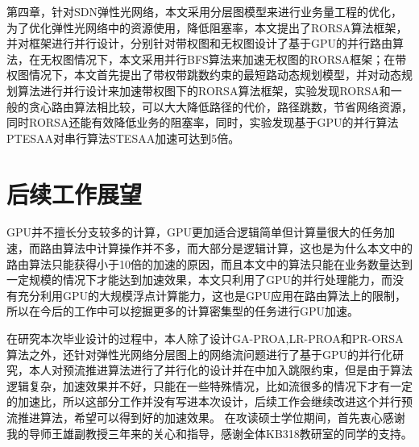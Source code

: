 \documentclass[master]{thesis-uestc}
\begin{document}
第四章，针对SDN弹性光网络，本文采用分层图模型来进行业务量工程的优化，为了优化弹性光网络中的资源使用，降低阻塞率，本文提出了RORSA算法框架，并对框架进行并行设计，分别针对带权图和无权图设计了基于GPU的并行路由算法，在无权图情况下，本文采用并行BFS算法来加速无权图的RORSA框架；在带权图情况下，本文首先提出了带权带跳数约束的最短路动态规划模型，并对动态规划算法进行并行设计来加速带权图下的RORSA算法框架，实验发现RORSA和一般的贪心路由算法相比较，可以大大降低路径的代价，路径跳数，节省网络资源，同时RORSA还能有效降低业务的阻塞率，同时，实验发现基于GPU的并行算法PTESAA对串行算法STESAA加速可达到5倍。

\section{后续工作展望}
GPU并不擅长分支较多的计算，GPU更加适合逻辑简单但计算量很大的任务加速，而路由算法中计算操作并不多，而大部分是逻辑计算，这也是为什么本文中的路由算法只能获得小于10倍的加速的原因，而且本文中的算法只能在业务数量达到一定规模的情况下才能达到加速效果，本文只利用了GPU的并行处理能力，而没有充分利用GPU的大规模浮点计算能力，这也是GPU应用在路由算法上的限制，所以在今后的工作中可以挖掘更多的计算密集型的任务进行GPU加速。

在研究本次毕业设计的过程中，本人除了设计GA-PROA,LR-PROA和PR-ORSA算法之外，还针对弹性光网络分层图上的网络流问题进行了基于GPU的并行化研究，本人对预流推进算法进行了并行化的设计并在中加入跳限约束，但是由于算法逻辑复杂，加速效果并不好，只能在一些特殊情况，比如流很多的情况下才有一定的加速比，所以这部分工作并没有写进本次设计，后续工作会继续改进这个并行预流推进算法，希望可以得到好的加速效果。
\thesisacknowledgement
在攻读硕士学位期间，首先衷心感谢我的导师王雄副教授三年来的关心和指导，感谢全体KB318教研室的同学的支持。
\end{document}

